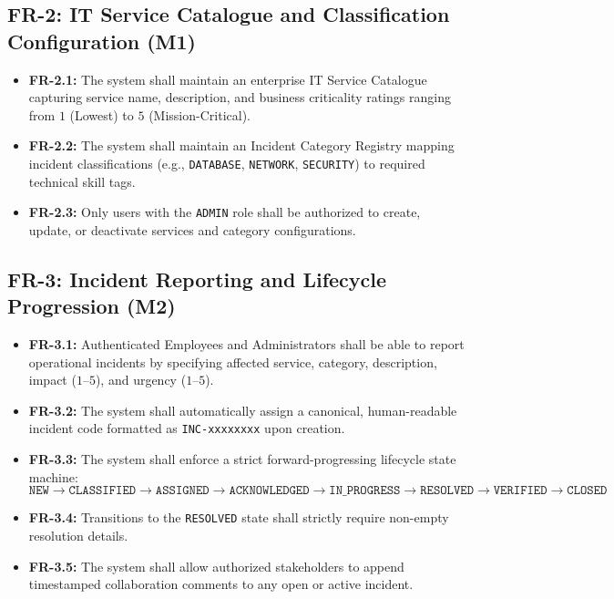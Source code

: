 \documentclass[11pt,a4paper,oneside]{report}
\begin{document}
\subsection{FR-2: IT Service Catalogue and Classification Configuration (M1)}
\begin{itemize}
    \item \textbf{FR-2.1:} The system shall maintain an enterprise IT Service Catalogue capturing service name, description, and business criticality ratings ranging from $1$ (Lowest) to $5$ (Mission-Critical).
    \item \textbf{FR-2.2:} The system shall maintain an Incident Category Registry mapping incident classifications (e.g., \texttt{DATABASE}, \texttt{NETWORK}, \texttt{SECURITY}) to required technical skill tags.
    \item \textbf{FR-2.3:} Only users with the \texttt{ADMIN} role shall be authorized to create, update, or deactivate services and category configurations.
\end{itemize}

\subsection{FR-3: Incident Reporting and Lifecycle Progression (M2)}
\begin{itemize}
    \item \textbf{FR-3.1:} Authenticated Employees and Administrators shall be able to report operational incidents by specifying affected service, category, description, impact ($1$--$5$), and urgency ($1$--$5$).
    \item \textbf{FR-3.2:} The system shall automatically assign a canonical, human-readable incident code formatted as \texttt{INC-xxxxxxxx} upon creation.
    \item \textbf{FR-3.3:} The system shall enforce a strict forward-progressing lifecycle state machine:
    \[
    \texttt{NEW} \longrightarrow \texttt{CLASSIFIED} \longrightarrow \texttt{ASSIGNED} \longrightarrow \texttt{ACKNOWLEDGED} \longrightarrow \texttt{IN\_PROGRESS} \longrightarrow \texttt{RESOLVED} \longrightarrow \texttt{VERIFIED} \longrightarrow \texttt{CLOSED}
    \]
    \item \textbf{FR-3.4:} Transitions to the \texttt{RESOLVED} state shall strictly require non-empty resolution details.
    \item \textbf{FR-3.5:} The system shall allow authorized stakeholders to append timestamped collaboration comments to any open or active incident.
\end{itemize}
\end{document}
